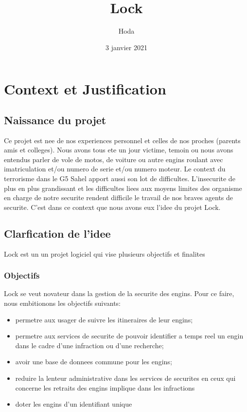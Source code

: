 \documentclass{book}
\title{Lock}
\author{Hoda \bsc{DABONNE}}
\date{3 janvier 2021}
\begin{document}
 
\maketitle
  

\chapter{ Context et Justification }
    
\section{Naissance du projet}
Ce projet est nee de nos experiences personnel et celles de nos proches 
(parents amis et colleges).
Nous avons tous ete un jour victime, temoin ou nous avons entendus parler de vole de motos,
de voiture ou autre engins roulant avec imatriculation et/ou numero de serie et/ou numero
moteur. Le context du terrorisme dans le G5 Sahel apport aussi son lot de difficultes. 
L'insecurite de plus en plus grandissant et les difficultes 
liees aux moyens limites des organisme en charge de notre securite rendent difficile le
travail de nos braves agents de securite. C'est dans ce context que nous avons eux l'idee du projet Lock.

\section{Clarfication de l'idee}
Lock est un un projet logiciel qui vise plusieurs objectifs et finalites
\subsection{Objectifs}
Lock se veut novateur dans la gestion de la securite des engins. Pour ce faire, nous embitionons les objectifs suivants:
\begin{itemize}
    \item permetre aux usager de suivre les itineraires de leur engins;
    \item permetre aux services de securite de pouvoir identifier a temps reel un engin dans le cadre d'une infraction ou d'une recherche;
    \item avoir une base de donnees commune pour les engins;
    \item reduire la lenteur administrative dans les services de securites en ceux qui concerne les retraits des engins implique dans 
    les infractions
    \item doter les engins d'un identifiant unique 
\end{itemize}
\end{document}
